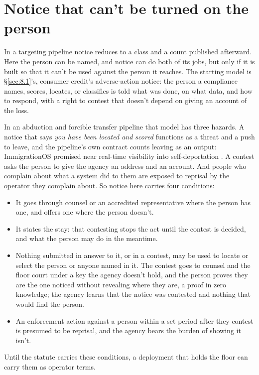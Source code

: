 \section{Notice that can't be turned on the person}
\label{sec:11.6}
In a targeting pipeline notice reduces to a class and a count published afterward. Here the person can be named, and notice can do both of its jobs, but only if it is built so that it can't be used against the person it reaches. The starting model is \S\ref{sec:8.1}'s, consumer credit's adverse-action notice: the person a compliance names, scores, locates, or classifies is told what was done, on what data, and how to respond, with a right to contest that doesn't depend on giving an account of the loss.

In an abduction and forcible transfer pipeline that model has three hazards. A notice that says \emph{you have been located and scored} functions as a threat and a push to leave, and the pipeline's own contract counts leaving as an output: ImmigrationOS promised near real-time visibility into self-deportation \autocite{Ho2025ImmigrationOS}. A contest asks the person to give the agency an address and an account. And people who complain about what a system did to them are exposed to reprisal by the operator they complain about. So notice here carries four conditions:

\begin{itemize}
\item It goes through counsel or an accredited representative where the person has one, and offers one where the person doesn't.
\item It states the stay: that contesting stops the act until the contest is decided, and what the person may do in the meantime.
\item Nothing submitted in answer to it, or in a contest, may be used to locate or select the person or anyone named in it. The contest goes to counsel and the floor court under a key the agency doesn't hold, and the person proves they are the one noticed without revealing where they are, a proof in zero knowledge; the agency learns that the notice was contested and nothing that would find the person.
\item An enforcement action against a person within a set period after they contest is presumed to be reprisal, and the agency bears the burden of showing it isn't.
\end{itemize}

Until the statute carries these conditions, a deployment that holds the floor can carry them as operator terms.
